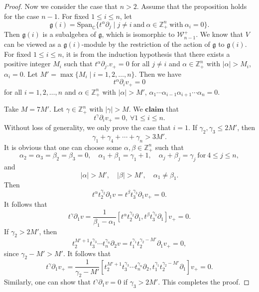 \documentclass[12pt, a4paper]{amsart}
\newcommand{\Z}{\mathbb Z}
\theoremstyle{Theorem}
\theoremstyle{Theorem}
\numberwithin{equation}{section}
\begin{document}
\begin{proof}
	Now we consider the case that  $n>2$. Assume that the proposition holds for the case $n-1$. For fixed $1\le i\le n$, let
	\begin{equation*}
		\mathfrak{g}(i)=\mathrm{Span}_{\mathbb{C}}\{t^{\alpha}\partial_j\mid j\neq i~\text{and}~\alpha\in\mathbb{Z}_+^n~\text{with}~\alpha_i=0\}.
	\end{equation*}
	Then $\mathfrak{g}(i)$ is a subalgebra of $\mathfrak{g}$, which is isomorphic to $\mathcal{W}_{n-1}^+$. We know that $V$ can be viewed as a $\mathfrak{g}(i)$-module by the restriction of the action of $\mathfrak{g}$ to $\mathfrak{g}(i)$. For fixed $1\leq i\leq n$, it is from the induction hypothesis that there exists a positive integer $M_{i}$ such that $t^{\alpha}\partial_{j}.v_{+}=0$ for all $j\neq i$ and $\alpha\in\Z_{+}^{n}$ with $|\alpha|>M_{i}$, $\alpha_{i}=0$. Let $M'=\max\{M_{i}\mid i=1,2,\dots,n\}$. Then we have
	\[t^{\alpha}\partial_{i}v_{+}=0\]
	for all $i=1,2,\dots,n$ and $\alpha\in\Z_{+}^{n}$ with $|\alpha|>M'$, $\alpha_{1}\cdots\alpha_{i-1}\alpha_{i+1}\cdots\alpha_{n}=0$.
		\bigskip
	
	Take $M=7M'$. Let $\gamma\in\mathbb{Z}_+^n$ with $|\gamma|>M$. We $\mathbf{claim}$ that
	\begin{equation*}
		t^{\gamma}\partial_iv_+=0,~\forall 1\le i\le n.
	\end{equation*}
	Without loss of generality, we only prove the case that $i=1$. 
	If $\gamma_2,\gamma_3\le 2M'$, then
	\begin{equation*}
		\gamma_1+\gamma_4+\cdots+\gamma_n>3M'.
	\end{equation*}
	It is obvious that one can choose some $\alpha,\beta\in\Z_{+}^{n}$ such that 
	\[\alpha_{2}=\alpha_{3}=\beta_{2}=\beta_{3}=0,\quad \alpha_{1}+\beta_{1}=\gamma_{1}+1,\quad \alpha_{j}+\beta_{j}=\gamma_{j} \ \text{for} \ 4\leq j\leq n,\]
	and 
	\[|\alpha|>M',\quad |\beta|>M',\quad \alpha_{1}\neq \beta_{1}.\]
Then 
	\begin{equation*}
		t^{\alpha}t_2^{\gamma_2}\partial_1v=t^{\beta}t_3^{\gamma_3}\partial_1v_+=0.
	\end{equation*}
	It follows that 
	\begin{equation*}
		t^{\gamma}\partial_1v=\frac{1}{\beta_1-\alpha_1}\left[	t^{\alpha}t_2^{\gamma_2}\partial_1,t^{\beta}t_3^{\gamma_3}\partial_1\right]v_+=0.
	\end{equation*}
	If $\gamma_2>2M'$, then
	\begin{equation*}
		t_2^{M'+1}t_3^{\gamma_3}\cdots t_n^{\gamma_n}\partial_2v=t_1^{\gamma_1}t_2^{\gamma_2-M'}\partial_1v_+=0,
	\end{equation*}
	since $\gamma_2-M'>M'$. It follows that
	\begin{equation*}
		t^{\gamma}\partial_1v_+=\frac{1}{\gamma_2-M'}\left[t_2^{M'+1}t_3^{\gamma_3}\cdots t_n^{\gamma_n}\partial_2,t_1^{\gamma_1}t_2^{\gamma_2-M'}\partial_1\right]v_+=0.
	\end{equation*}
	Similarly, one can show that 	$t^{\gamma}\partial_1v=0$ if $\gamma_3>2M'$.	This completes the proof.
\end{proof}
\end{document}
